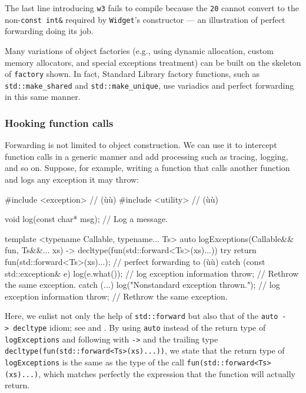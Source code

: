 \noindent The last line introducing \lstinline!w3! fails to compile because the
 \lstinline!20! cannot convert to the
non-\lstinline!const!~\lstinline!int&! required by \lstinline!Widget!'s
constructor --- an illustration of perfect forwarding doing its job.

Many variations of object factories (e.g., using dynamic allocation,
custom memory allocators, and special exceptions treatment) can be built
on the skeleton of \lstinline!factory! shown. In fact, Standard Library
factory functions, such as \lstinline!std::make_shared! and
\lstinline!std::make_unique!, use variadics and perfect forwarding in this
same manner.

\subsubsection[Hooking function calls]{Hooking function calls}\label{hooking-function-calls}

Forwarding is not limited to object construction. We can use it to
intercept function calls in a generic manner and add processing such as
tracing, logging, and so on. Suppose, for example, writing a function
that calls another function and logs any exception it may throw:

\begin{emcppslisting}
#include <exception>                           // (ù{}ù)
#include <utility>                             // (ù{}ù)

void log(const char* msg);                     // Log a message.

template <typename Callable, typename... Ts>
auto logExceptions(Callable&& fun, Ts&&... xs)
    -> decltype(fun(std::forward<Ts>(xs)...))
{
    try
    {
        return fun(std::forward<Ts>(xs)...);   // perfect forwarding to (ù{}ù)
    }
    catch (const std::exception& e)
    {
        log(e.what());                         // log exception information
        throw;                                 // Rethrow the same exception.
    }
    catch (...)
    {
        log("Nonstandard exception thrown.");  // log exception information
        throw;                                 // Rethrow the same exception.
    }
}
\end{emcppslisting}
    

\noindent Here, we enlist not only the help of \lstinline!std::forward! but also that
of the \lstinline!auto!~\lstinline!->!~\lstinline!decltype! idiom; see
 and
. By using \lstinline!auto! instead of the
return type of \lstinline!logExceptions! and following with \lstinline!->! and
the trailing type \lstinline!decltype(fun(std::forward<Ts>(xs)...))!, we
state that the return type of \lstinline!logExceptions! is the same as the
type of the call \lstinline!fun(std::forward<Ts>(xs)...)!, which matches
perfectly the expression that the function will actually return.

